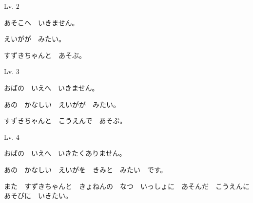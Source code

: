 	\begin{mondai}{Lv. 2}
		\item あそこへ　いきません。
		\item えいがが　みたい。
		\item すずきちゃんと　あそぶ。
	\end{mondai}

	\begin{mondai}{Lv. 3}
		\item おばの　いえへ　いきません。
		\item あの　かなしい　えいがが　みたい。
		\item すずきちゃんと　こうえんで　あそぶ。
	\end{mondai}

	\begin{mondai}{Lv. 4}
		\item おばの　いえへ　いきたくありません。
		\item あの　かなしい　えいがを　きみと　みたい　です。
		\item また　すずきちゃんと　きょねんの　なつ　いっしょに　あそんだ　こうえんに　あそびに　いきたい。
	\end{mondai}
